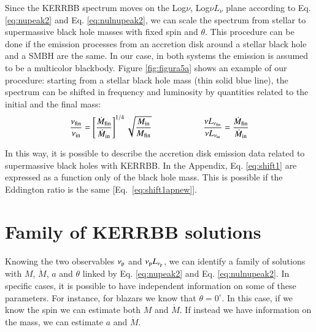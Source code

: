 \documentclass{aa}
\begin{document}
Since the KERRBB spectrum moves on the Log$\nu$, Log$\nu L_{\nu}$ plane according to Eq. \eqref{eq:nupeak2} and Eq. \eqref{eq:nulnupeak2}, we can scale the spectrum from stellar to supermassive black hole masses with fixed spin and $\theta$. This procedure can be done if the emission processes from an accretion disk around a stellar black hole and a SMBH are the same. In our case, in both systems the emission is assumed to be a multicolor blackbody. Figure \ref{fig:figura5a} shows an example of our procedure: starting from a stellar black hole mass (thin solid blue line), the spectrum can be shifted in frequency and luminosity by quantities related to the initial and the final mass:
	\begin{equation} \label{eq:shift1}
		\frac{\nu_{\rm fin}}{\nu_{\rm in}} = \left[ \frac{\dot{M}_{\rm fin}}{\dot{M}_{\rm in}} \right]^{1/4} \sqrt{ \frac{M_{\rm in}}{M_{\rm fin}} } \qquad \qquad \qquad 
		\frac{\nu L_{\nu_{\rm fin}}}{\nu L_{\nu_{\rm in}}} = \frac{\dot{M}_{\rm fin}}{\dot{M}_{\rm in}}
	\end{equation}

In this way, it is possible to describe the accretion disk emission data related to supermassive black holes with KERRBB. In the Appendix, Eq. \eqref{eq:shift1} are expressed as a function only of the black hole mass. This is possible if the Eddington ratio is the same [Eq.~\eqref{eq:shift1apnew}]. 










\section{Family of KERRBB solutions} \label{KERRfamily}

Knowing the two observables $\nu_{\rm p}$ and $\nu_{\rm p}L_{\nu_{\rm p}}$, we can identify a family of solutions with $M$, $\dot{M}$, $a$ and $\theta$ linked by Eq. \eqref{eq:nupeak2} and Eq. \eqref{eq:nulnupeak2}. In specific cases, it is possible to have independent information on some of these parameters. For instance, for blazars we know that $\theta = 0^\circ$. In this case, if we know the spin we can estimate both $M$ and $\dot M$. If instead we have information on the mass, we can estimate $a$ and $\dot{M}$.
\end{document}
